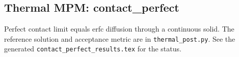 \subsection{Thermal MPM: contact\_perfect}
Perfect contact limit equals erfc diffusion through a continuous solid. The reference solution and acceptance metric are in \texttt{thermal\_post.py}. See the generated \texttt{contact\_perfect\_results.tex} for the status.
